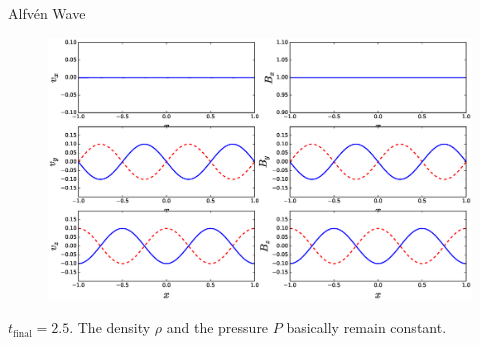 \documentclass[12pt]{beamer}
\begin{document}
\begin{frame}{Alfv\'en Wave}
\begin{figure}[ht]
	\centering
	\begin{minipage}[c]{1\textwidth}
		\includegraphics[width=1\textwidth]{AW.eps}
	\end{minipage}%
\end{figure}
\tiny{$t_{\text{final}} =2.5$. The density $\rho$ and the pressure $P$ basically remain constant.}
\end{frame}
\end{document}
